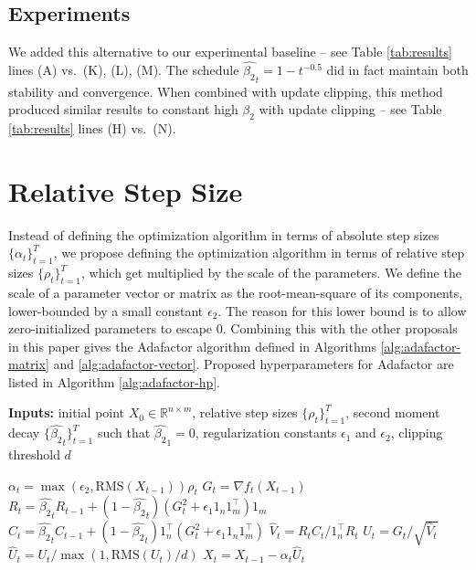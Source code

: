 \documentclass{article}
\begin{document}
\subsection{Experiments}
We added this alternative to our experimental baseline -- see Table \ref{tab:results} lines (A) vs.\ (K), (L), (M).  The schedule $\hat{\beta_2}_t=1-t^{-0.5}$ did in fact maintain both stability and convergence.  When combined with update clipping, this method produced similar results to constant high $\beta_2$ with update clipping -- see Table \ref{tab:results} lines (H) vs.\ (N).

\section{Relative Step Size}

Instead of defining the optimization algorithm in terms of absolute step sizes $\{\alpha_t\}_{t=1}^T$, we propose defining the optimization algorithm in terms of relative step sizes $\{\rho_t\}_{t=1}^T$, which get multiplied by the scale of the parameters.  We define the scale of a parameter vector or matrix as the root-mean-square of its components, lower-bounded by a small constant $\epsilon_2$.  The reason for this lower bound is to allow zero-initialized parameters to escape 0.   Combining this with the other proposals in this paper gives the Adafactor algorithm defined in Algorithms \ref{alg:adafactor-matrix} and \ref{alg:adafactor-vector}.  Proposed hyperparameters for Adafactor are listed in Algorithm \ref{alg:adafactor-hp}.  

\begin{algorithm}[t]
\begin{algorithmic}[1]
\STATE \textbf{Inputs:} initial point $X_0 \in \mathbb{R}^{n \times m}$, relative step sizes $\{\rho_t\}_{t=1}^T$, second moment decay $\{\hat{\beta_2}_t\}_{t=1}^T$ such that $\hat{\beta_2}_1=0$, regularization constants $\epsilon_1$ and $\epsilon_2$, clipping threshold $d$

  \STATE $\alpha_t = \max\left(\epsilon_2, \mathrm{RMS}(X_{t-1})\right) \rho_t$
  \STATE $G_t = \nabla f_t(X_{t-1})$
  \STATE $R_t = \hat{\beta_2}_t R_{t-1} + (1 - \hat{\beta_2}_t) (G_t^2 + \epsilon_1 1_n 1_m^\top) 1_m$
  \STATE $C_t = \hat{\beta_2}_t C_{t-1} + (1 - \hat{\beta_2}_t) 1_n^\top (G_t^2 + \epsilon_1 1_n 1_m^\top)$
  \STATE $\hat{V}_t = R_t C_t / 1_n^\top R_t$
  \STATE $U_t = G_t / \sqrt{\hat{V}_t}$
  \STATE $\hat{U}_t = U_t / \max\left(1, \mathrm{RMS}(U_t)/d\right)$
  \STATE $X_t = X_{t-1} - \alpha_t \hat{U}_t$
\ENDFOR
\end{algorithmic}
\caption{Adafactor for weight matrices.}
\label{alg:adafactor-matrix}
\end{algorithm}
\end{document}
